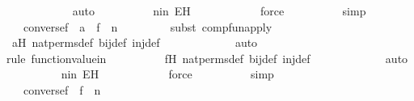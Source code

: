 \begin{isabellebody}
\ \ \ \ \ \ \ \ \ \ \isamarkupfalse%
\ auto{\isacharbrackleft}{\kern0pt}{}{\isacharbrackright}{\kern0pt}\isanewline
\ \ \ \ \ \ \ \ \isamarkupfalse%
\ nin\ EH\ \isanewline
\ \ \ \ \ \ \ \ \ \isamarkupfalse%
\ force\isanewline
\ \ \ \ \ \ \ \ \isamarkupfalse%
\ simp\isanewline
\ \ \ \ \ \ \isamarkupfalse%
\ \isamarkupfalse%
\ {\isachardoublequoteopen}{\isachardot}{\kern0pt}{\isachardot}{\kern0pt}{\isachardot}{\kern0pt}\ {\isacharequal}{\kern0pt}\ converse{\isacharparenleft}{\kern0pt}f{\isacharparenright}{\kern0pt}\ {\isacharbackquote}{\kern0pt}\ {\isacharparenleft}{\kern0pt}a\ {\isacharbackquote}{\kern0pt}\ {\isacharparenleft}{\kern0pt}f\ {\isacharbackquote}{\kern0pt}\ n{\isacharparenright}{\kern0pt}{\isacharparenright}{\kern0pt}{\isachardoublequoteclose}\isanewline
\ \ \ \ \ \ \ \ \isamarkupfalse%
{\isacharparenleft}{\kern0pt}subst\ comp{\isacharunderscore}{\kern0pt}fun{\isacharunderscore}{\kern0pt}apply{\isacharparenright}{\kern0pt}\isanewline
\ \ \ \ \ \ \ \ \isamarkupfalse%
\ aH\ nat{\isacharunderscore}{\kern0pt}perms{\isacharunderscore}{\kern0pt}def\ bij{\isacharunderscore}{\kern0pt}def\ inj{\isacharunderscore}{\kern0pt}def\ \isanewline
\ \ \ \ \ \ \ \ \ \ \isamarkupfalse%
\ auto{\isacharbrackleft}{\kern0pt}{}{\isacharbrackright}{\kern0pt}\isanewline
\ \ \ \ \ \ \ \ \ \isamarkupfalse%
{\isacharparenleft}{\kern0pt}rule\ function{\isacharunderscore}{\kern0pt}value{\isacharunderscore}{\kern0pt}in{\isacharparenright}{\kern0pt}\isanewline
\ \ \ \ \ \ \ \ \isamarkupfalse%
\ fH\ nat{\isacharunderscore}{\kern0pt}perms{\isacharunderscore}{\kern0pt}def\ bij{\isacharunderscore}{\kern0pt}def\ inj{\isacharunderscore}{\kern0pt}def\ \isanewline
\ \ \ \ \ \ \ \ \ \ \isamarkupfalse%
\ auto{\isacharbrackleft}{\kern0pt}{}{\isacharbrackright}{\kern0pt}\isanewline
\ \ \ \ \ \ \ \ \isamarkupfalse%
\ nin\ EH\ \isanewline
\ \ \ \ \ \ \ \ \ \isamarkupfalse%
\ force\isanewline
\ \ \ \ \ \ \ \ \isamarkupfalse%
\ simp\isanewline
\ \ \ \ \ \ \isamarkupfalse%
\ \isamarkupfalse%
\ {\isachardoublequoteopen}{\isachardot}{\kern0pt}{\isachardot}{\kern0pt}{\isachardot}{\kern0pt}\ {\isacharequal}{\kern0pt}\ converse{\isacharparenleft}{\kern0pt}f{\isacharparenright}{\kern0pt}\ {\isacharbackquote}{\kern0pt}\ {\isacharparenleft}{\kern0pt}f\ {\isacharbackquote}{\kern0pt}\ n{\isacharparenright}{\kern0pt}{\isachardoublequoteclose}\ \isanewline

\end{isabellebody}
